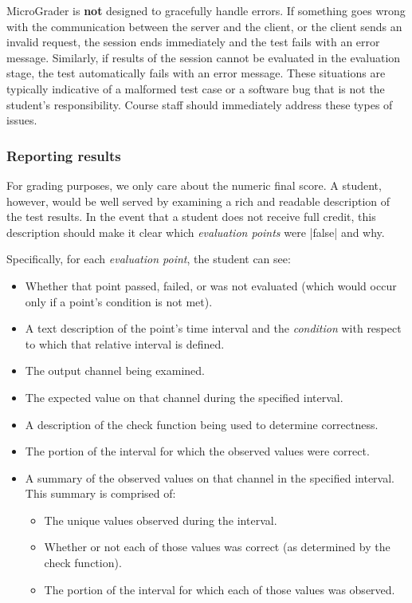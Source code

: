 \documentclass[12pt]{article}
\begin{document}
MicroGrader is \textbf{not} designed to gracefully handle errors.  If something goes wrong with the communication between the server and the client, or the client sends an invalid request, the session ends immediately and the test fails with an error message.  Similarly, if results of the session cannot be evaluated in the evaluation stage, the test automatically fails with an error message.  These situations are typically indicative of a malformed test case or a software bug that is not the student's responsibility.  Course staff should immediately address these types of issues.


\subsubsection{Reporting results}
For grading purposes, we only care about the numeric final score.  A student, however, would be well served by examining a rich and readable description of the test results.  In the event that a student does not receive full credit, this description should make it clear which \textit{evaluation points} were |false| and why.

Specifically, for each \textit{evaluation point}, the student can see:

\begin{itemize}
\item Whether that point passed, failed, or was not evaluated (which would occur only if a point's condition is not met).
\item A text description of the point's time interval and the \textit{condition} with respect to which that relative interval is defined.
\item The output channel being examined.
\item The expected value on that channel during the specified interval.
\item A description of the check function being used to determine correctness.
\item The portion of the interval for which the observed values were correct.
\item A summary of the observed values on that channel in the specified interval.  This summary is comprised of:
\begin{itemize}
\item The unique values observed during the interval.
\item Whether or not each of those values was correct (as determined by the check function).
\item The portion of the interval for which each of those values was observed.
\end{itemize}
\end{itemize}
\end{document}
